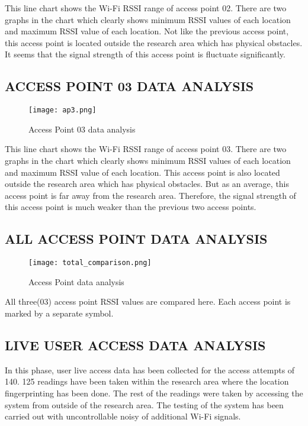 This line chart shows the Wi-Fi RSSI range of access point 02. There are two graphs in the chart which clearly shows minimum RSSI values of each location and maximum RSSI value of each location. Not like the previous access point, this access point is located outside the research area which has physical obstacles. It seems that the signal strength of this access point is fluctuate significantly.

\newpage
\subsection{ACCESS POINT 03 DATA ANALYSIS}  
\begin{center}
	\begin{figure*}[h]	
		\centering
		\texttt{[image: ap3.png]}
		\caption{Access Point 03 data analysis}
	\end{figure*}
\end{center} 

This line chart shows the Wi-Fi RSSI range of access point 03. There are two graphs in the chart which clearly shows minimum RSSI values of each location and maximum RSSI value of each location. This access point is also located outside the research area which has physical obstacles. But as an average, this access point is far away from the research area. Therefore, the signal strength of this access point is much weaker than the previous two access points.

\newpage 
\subsection{ALL ACCESS POINT DATA ANALYSIS}  
\begin{center}
	\begin{figure*}[h]	
		\centering
		\texttt{[image: total\_comparison.png]}
		\caption{Access Point data analysis}
	\end{figure*}
\end{center} 

All three(03) access point RSSI values are compared here. Each access point is marked by a separate symbol.

\newpage
\subsection{LIVE USER ACCESS DATA ANALYSIS}

In this phase, user live access data has been collected for the access attempts of 140. 125 readings have been taken within the research area where the location fingerprinting has been done. The rest of the readings were taken by accessing the system from outside of the research area. The testing of the system has been carried out with uncontrollable noisy of additional Wi-Fi signals.

